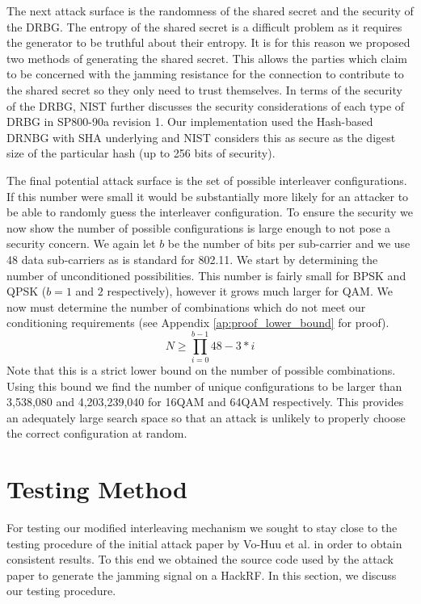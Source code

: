 \documentclass[sigconf]{acmart}
\begin{document}
The next attack surface is the randomness of the shared secret and the security of the DRBG. The entropy of the shared secret is a difficult problem as it requires the generator to be truthful about their entropy. It is for this reason we proposed two methods of generating the shared secret. This allows the parties which claim to be concerned with the jamming resistance for the connection to contribute to the shared secret so they only need to trust themselves. In terms of the security of the DRBG, NIST further discusses the security considerations of each type of DRBG in SP800-90a revision 1\cite{barker2015nist90a}. Our implementation used the Hash-based DRNBG with SHA underlying and NIST considers this as secure as the digest size of the particular hash (up to 256 bits of security). 

The final potential attack surface is the set of possible interleaver configurations. If this number were small it would be substantially more likely for an attacker to be able to randomly guess the interleaver configuration. To ensure the security we now show the number of possible configurations is large enough to not pose a security concern. We again let $b$ be the number of bits per sub-carrier and we use 48 data sub-carriers as is standard for 802.11. We start by determining the number of unconditioned possibilities. This number is fairly small for BPSK and QPSK ($b= 1$ and $2$ respectively), however it grows much larger for QAM. We now must determine the number of combinations which do not meet our conditioning requirements (see Appendix \ref{ap:proof_lower_bound} for proof). 
$$N \geq \prod_{i=0}^{b-1} 48 - 3*i$$
Note that this is a strict lower bound on the number of possible combinations. Using this bound we find the number of unique configurations to be larger than 3,538,080 and 4,203,239,040 for 16QAM and 64QAM respectively.  This provides an adequately large search space so that an attack is unlikely to properly choose the correct configuration at random.

\section{Testing Method}
\label{sec:testing}

For testing our modified interleaving mechanism we sought to stay close to the testing procedure of the initial attack paper by Vo-Huu et al. in order to obtain consistent results\cite{vo2016interleaving}. To this end we obtained the source code used by the attack paper to generate the jamming signal on a HackRF\cite{vo2016software}. In this section, we discuss our testing procedure.
\end{document}
